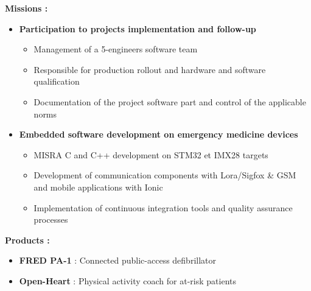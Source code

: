 {\begin{itemize}[leftmargin=\ListItemsMargins]
	\end{itemize}
\else
	\textcolor{color1}{\textbf{Missions :}}
	\begin{itemize}[leftmargin=\ListItemsMargins]
		\item \textbf{Participation to projects implementation and follow-up}
		\begin{itemize}
			\item Management of a 5-engineers software team
			\item Responsible for production rollout and hardware and software qualification
			\item Documentation of the project software part and control of the applicable norms
		\end{itemize}
		\item \textbf{Embedded software development on emergency medicine devices}
		\begin{itemize}
			\item MISRA C and C++ development on STM32 et IMX28 targets
			\item Development of communication components with Lora/Sigfox \& GSM and mobile applications with Ionic
			\item Implementation of continuous integration tools and quality assurance processes
		\end{itemize}
	\end{itemize}
	\textcolor{color1}{\textbf{Products :}}
	\begin{itemize}[leftmargin=\ListItemsMargins]
		\item \textbf{FRED PA-1} : Connected public-access defibrillator \textcolor{color1}{\href{http://www.schiller.ch/corp/en/product/fred-pa-1}{\ExternalLink}}
		\item \textbf{Open-Heart} : Physical activity coach for at-risk patients \textcolor{color1}{\href{http://www.schiller.ch/corp/en/schiller-cutting-edge-connected-health}{\ExternalLink}}
	\end{itemize}
\fi
}



\vspace{\ItemsMaxSpacing}

